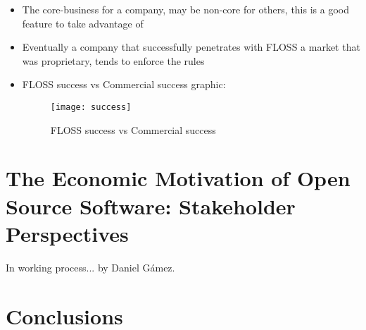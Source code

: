 \begin{itemize}
\item The core-business for a company, may be non-core for others, this is a good feature to take advantage of
\item Eventually a company that successfully penetrates with FLOSS a market that was proprietary, tends to enforce the rules
\item FLOSS success vs Commercial success graphic:
\begin{figure}[h]
\begin{center}
\texttt{[image: success]}
\caption{FLOSS success vs Commercial success}
\label{fig:success}
\end{center}
\end{figure}
\end{itemize}


\section{The Economic Motivation of Open Source Software: Stakeholder Perspectives}\label{Part II}

In working process... by Daniel G\'amez.\\

\section{Conclusions}\label{conclusions}
